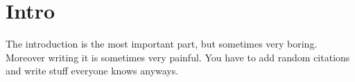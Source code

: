\section{Intro}
The introduction is the most important part, but sometimes very boring. Moreover writing it is sometimes very painful.
You have to add random citations and write stuff everyone knows anyways.

